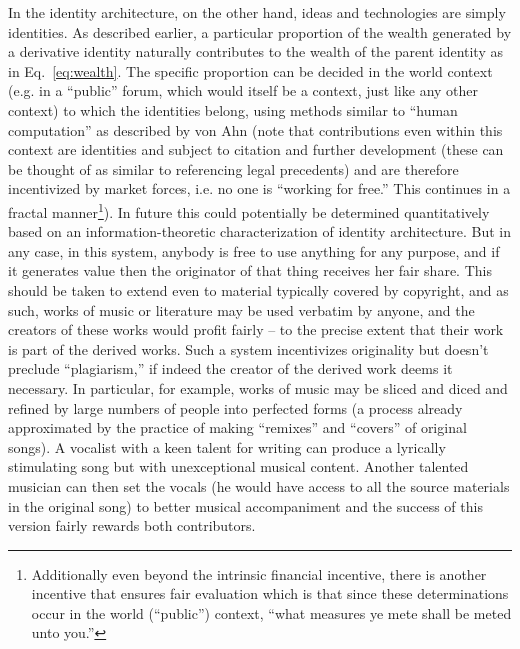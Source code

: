 \documentclass[pra,twocolumn,groupedaddress,10pt]{revtex4}
\theoremstyle{definition}
\begin{document}
In the identity architecture, on the other hand, ideas and technologies are simply identities. As described earlier, a particular proportion of the wealth generated by a derivative identity naturally contributes to the wealth of the parent identity as in Eq.~\ref{eq:wealth}. The specific proportion can be decided in the world context (e.g. in a ``public'' forum, which would itself be a context, just like any other context) to which the identities belong, using methods similar to ``human computation'' as described by von Ahn\cite{vonahn} (note that contributions even within this context are identities and subject to citation and further development (these can be thought of as similar to referencing legal precedents) and are therefore incentivized by market forces, i.e. no one is ``working for free.'' This continues in a fractal manner\footnote{Additionally even beyond the intrinsic financial incentive, there is another incentive that ensures fair evaluation which is that since these determinations occur in the world (``public'') context, ``what measures ye mete shall be meted unto you.''}). In future this could potentially be determined quantitatively based on an information-theoretic characterization of identity architecture. But in any case, in this system, anybody is free to use anything for any purpose, and if it generates value then the originator of that thing receives her fair share. This should be taken to extend even to material typically covered by copyright, and as such, works of music or literature may be used verbatim by anyone, and the creators of these works would profit fairly -- to the precise extent that their work is part of the derived works. Such a system incentivizes originality but doesn't preclude ``plagiarism,'' if indeed the creator of the derived work deems it necessary. In particular, for example, works of music may be sliced and diced and refined by large numbers of people into perfected forms (a process already approximated by the practice of making ``remixes'' and ``covers'' of original songs). A vocalist with a keen talent for writing can produce a lyrically stimulating song but with unexceptional musical content. Another talented musician can then set the vocals (he would have access to all the source materials in the original song) to better musical accompaniment and the success of this version fairly rewards both contributors.
\end{document}

